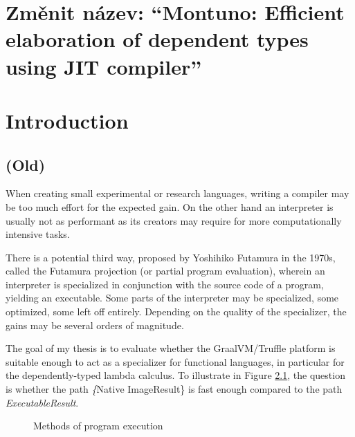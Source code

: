\documentclass[english,zadani,odsaz]{fitthesis}
\date{\today}
\title{}
\begin{document}
\maketitle
\setlength{\parskip}{0pt}
{\hypersetup{hidelinks}\tableofcontents}
\iftotalfigures\listoffigures\fi
\iftotaltables\listoftables\fi
\iftotallistings\listoflistings\fi
\iftwoside\cleardoublepage\fi
\setlength{\parskip}{0.5\bigskipamount}

\chapter{Změnit název: ``Montuno: Efficient elaboration of dependent types using JIT compiler''}
\label{sec:org605e2a9}

\chapter{Introduction}
\label{sec:org44f3e9a}
\section{(Old)}
\label{sec:org2ef14f0}
When creating small experimental or research languages, writing a compiler may
be too much effort for the expected gain. On the other hand an interpreter is
usually not as performant as its creators may require for more computationally
intensive tasks.

There is a potential third way, proposed by Yoshihiko Futamura in the 1970s,
called the Futamura projection (or partial program evaluation), wherein an
interpreter is specialized in conjunction with the source code of a program,
yielding an executable. Some parts of the interpreter may be specialized, some
optimized, some left off entirely. Depending on the quality of the specializer,
the gains may be several orders of magnitude.

The goal of my thesis is to evaluate whether the GraalVM/Truffle platform is
suitable enough to act as a specializer for functional languages, in particular
for the dependently-typed lambda calculus.  To illustrate in Figure
\ref{fig:futamora}, the question is whether the path \textit\{Native
Image\textrightarrow Result\} is fast enough compared to the path
\textit{Executable\textrightarrow Result}.

\begin{figure}
\centering
{}
\caption{Methods of program execution}
\label{fig:futamora}
\end{figure}
\end{document}
